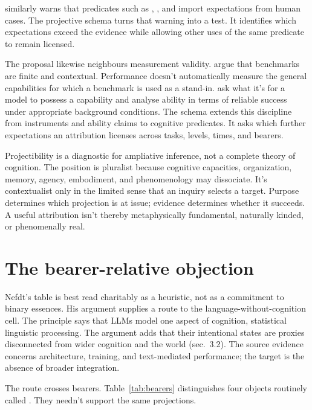 \documentclass[12pt]{article}
\begin{document}
\textcite{shanahan2024} similarly warns that predicates such as , , and  import expectations from human cases. The projective schema turns that warning into a test. It identifies which expectations exceed the evidence while allowing other uses of the same predicate to remain licensed.

The proposal likewise neighbours measurement validity. \textcite{raji2021whole} argue that benchmarks are finite and contextual. Performance doesn't automatically measure the general capabilities for which a benchmark is used as a stand-in. \textcite{hardingSharadin2024Capability} ask what it's for a model to possess a capability and analyse ability in terms of reliable success under appropriate background conditions. The schema extends this discipline from instruments and ability claims to cognitive predicates. It asks which further expectations an attribution licenses across tasks, levels, times, and bearers.

Projectibility is a diagnostic for ampliative inference, not a complete theory of cognition. The position is pluralist because cognitive capacities, organization, memory, agency, embodiment, and phenomenology may dissociate. It's contextualist only in the limited sense that an inquiry selects a target. Purpose determines which projection is at issue; evidence determines whether it succeeds. A useful attribution isn't thereby metaphysically fundamental, naturally kinded, or phenomenally real.

\section{The bearer-relative objection}

Nefdt's table is best read charitably as a heuristic, not as a commitment to binary essences. His argument supplies a route to the language-without-cognition cell. The  principle says that LLMs model one aspect of cognition, statistical linguistic processing. The  argument adds that their intentional states are proxies disconnected from wider cognition and the world (sec.~3.2). The source evidence concerns architecture, training, and text-mediated performance; the target is the absence of broader integration.

The route crosses bearers. Table~\ref{tab:bearers} distinguishes four objects routinely called . They needn't support the same projections.
\end{document}
